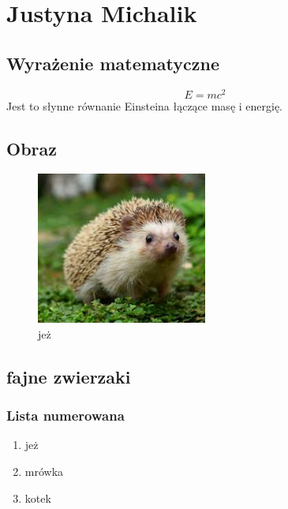 
% 


\section{Justyna Michalik}

\subsection{Wyrażenie matematyczne}
\begin{equation}
    E = mc^2
\end{equation}
Jest to słynne równanie Einsteina łączące masę i energię.

\subsection{Obraz}

\begin{figure}[H]
    \centering
    \includegraphics[width=0.5\textwidth]{pictures/pobrane.jpg}
    \caption{jeż}
    \label{fig:jeż}
\end{figure}

\subsection{fajne zwierzaki}
\subsubsection{Lista numerowana}
\begin{enumerate}
    \item jeż
    \item mrówka
    \item kotek
\end{enumerate}


